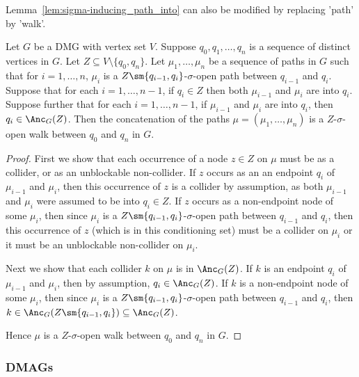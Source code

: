 Lemma~\ref{lem:sigma-inducing_path_into} can also be modified by replacing 'path' by 'walk'.

\begin{Lem}\label{lem:dpag_concatenated_collider_walk}
  Let $G$ be a DMG with vertex set $V$. 
  Suppose $q_0, q_1, \dots, q_n$ is a sequence of distinct vertices in $G$.
  Let $Z \subseteq V \setminus \{q_0,q_n\}$.
  Let $\mu_1,\dots,\mu_n$ be a sequence of paths in $G$ such that for $i=1,\dots,n$,
  $\mu_i$ is a $Z\sm\{q_{i-1},q_i\}$-$\sigma$-open path between $q_{i-1}$ and $q_i$.
  Suppose that for each $i=1,\dots,n-1$, if $q_i \in Z$ then both $\mu_{i-1}$ and $\mu_i$ are into $q_i$.
  Suppose further that for each $i=1,\dots,n-1$, if $\mu_{i-1}$ and $\mu_i$ are into $q_i$, then $q_i \in \Anc_G(Z)$.
  Then the concatenation of the paths $\mu = (\mu_1,\dots,\mu_n)$ is a $Z$-$\sigma$-open walk between $q_0$ and $q_n$ in $G$.
\end{Lem}
\begin{proof}
  First we show that each occurrence of a node $z \in Z$ on $\mu$ must be as a collider, or as an unblockable non-collider.
  If $z$ occurs as an an endpoint $q_i$ of $\mu_{i-1}$ and $\mu_i$, then this occurrence of $z$ is a collider by assumption, as both $\mu_{i-1}$ and $\mu_i$ were assumed to be into $q_i \in Z$.
  If $z$ occurs as a non-endpoint node of some $\mu_i$, then since $\mu_i$ is a $Z\sm\{q_{i-1},q_i\}$-$\sigma$-open path between $q_{i-1}$ and $q_i$, then this occurrence of $z$ (which is in this conditioning set) must be a collider on $\mu_i$ or it must be an unblockable non-collider on $\mu_i$.

  Next we show that each collider $k$ on $\mu$ is in $\Anc_G(Z)$.
  If $k$ is an endpoint $q_i$ of $\mu_{i-1}$ and $\mu_i$, then by assumption, $q_i \in \Anc_G(Z)$.
  If $k$ is a non-endpoint node of some $\mu_i$, then since $\mu_i$ is a $Z\sm\{q_{i-1},q_i\}$-$\sigma$-open path between $q_{i-1}$ and $q_i$, then $k \in \Anc_G(Z\sm\{q_{i-1},q_{i}\}) \subseteq \Anc_G(Z)$.

  Hence $\mu$ is a $Z$-$\sigma$-open walk between $q_0$ and $q_n$ in $G$.
\end{proof}

\subsubsection{DMAGs}

